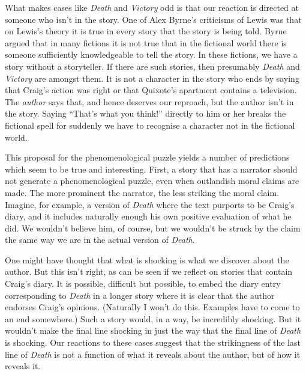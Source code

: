 What makes cases like \textit{Death} and \textit{Victory} odd is that our reaction is directed at someone who isn't in the story. One of Alex Byrne's \citeyearpar{Byrne1993} criticisms of Lewis was that on Lewis's theory it is true in every story that the story is being told. Byrne argued that in many fictions it is not true that in the fictional world there is someone sufficiently knowledgeable to tell the story. In these fictions, we have a story without a storyteller. If there are such stories, then presumably \textit{Death }and \textit{Victory} are amongst them. It is not a character in the story who ends by saying that Craig's action was right or that Quixote's apartment contains a television. The \textit{author} says that, and hence deserves our reproach, but the author isn't in the story. Saying ``That's what you think!'' directly to him or her breaks the fictional spell for suddenly we have to recognise a character not in the fictional world.

This proposal for the phenomenological puzzle yields a number of predictions which seem to be true and interesting. First, a story that has a narrator should not generate a phenomenological puzzle, even when outlandish moral claims are made. The more prominent the narrator, the less striking the moral claim. Imagine, for example, a version of \textit{Death} where the text purports to be Craig's diary, and it includes naturally enough his own positive evaluation of what he did. We wouldn't believe him, of course, but we wouldn't be struck by the claim the same way we are in the actual version of \textit{Death}.

One might have thought that what is shocking is what we discover about the author. But this isn't right, as can be seen if we reflect on stories that contain Craig's diary. It is possible, difficult but possible, to embed the diary entry corresponding to \textit{Death} in a longer story where it is clear that the author endorses Craig's opinions. (Naturally I won't do this. Examples have to come to an end somewhere.) Such a story would, in a way, be incredibly shocking. But it wouldn't make the final line shocking in just the way that the final line of \textit{Death} is shocking. Our reactions to these cases suggest that the strikingness of the last line of \textit{Death} is not a function of what it reveals about the author, but of how it reveals it.


